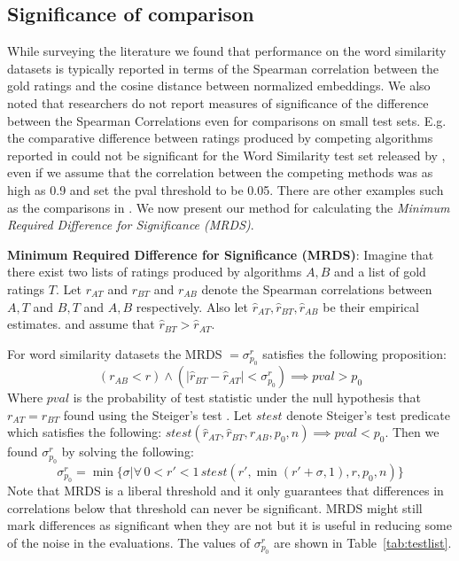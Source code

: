 \documentclass[11pt]{article}
\begin{document}
\subsection{Significance of comparison} \label{ssec:mdrs}
While surveying the literature
we found that performance on the word similarity datasets is typically
reported in terms of the Spearman correlation between the gold ratings
and the cosine distance between normalized embeddings.
We also noted that researchers do not report
measures of significance of the difference between
the Spearman Correlations even for comparisons on small test sets.
E.g. the comparative difference between ratings produced by competing
algorithms reported in \cite{faruqui2014retrofitting}  
could not be significant for the Word Similarity test set released by
,
even if we assume that the correlation between the competing methods was as high as 0.9 and set the
pval threshold to be 0.05. There are other examples such as the
comparisons in \cite{hill2014not}. We now present our method for calculating the
\emph{Minimum Required Difference for Significance (MRDS)}.%

\noindent\textbf{Minimum Required Difference for Significance (MRDS)}:
Imagine that there exist two lists of ratings produced by algorithms $A, B$ and a list of gold
ratings $T$. Let $r_{AT}$ and $r_{BT}$ and $r_{AB}$ denote the
Spearman correlations between $A, T$ and $B, T$ and $A, B$ respectively. Also let
$\hat{r}_{AT}, \hat{r}_{BT}, \hat{r}_{AB}$ be their empirical
estimates. and assume that $\hat{r}_{BT} > \hat{r}_{AT}$.

For word similarity datasets the MRDS $=\sigma_{p_0}^r$ satisfies the following proposition:
{\small $$ (r_{AB} < r) \land (|\hat{r}_{BT} - \hat{r}_{AT}|{<}\sigma_{p_0}^r)
  {\implies} \textit{pval} > p_0$$}
Where $\textit{pval}$ is the probability of test statistic under the
null hypothesis that $r_{AT} = r_{BT}$ found using the Steiger's test \cite{steiger1980tests}.
Let $\textit{stest}$
denote Steiger's test predicate which satisfies the following:
$\textit{stest}(\hat{r}_{AT}, \hat{r}_{BT}, r_{AB}, p_0, n)
{\implies} \textit{pval} < p_0$. Then we found
$\sigma_{p_0}^r$ by solving the following:
{\small $$\sigma_{p_0}^r = \min\{\sigma | \forall\, 0 {<} r' {<} 1\, \textit{stest}(r',
\min(r'+\sigma, 1), r, p_0, n) \} $$}
Note that MRDS is a liberal threshold and it only guarantees that
differences in correlations below that threshold can never be
significant. MRDS might still mark differences as significant
when they are not but it is useful in reducing some of the noise in
the evaluations.  The values of $\sigma_{p_0}^r$ are shown in
Table~\ref{tab:testlist}.
\end{document}
